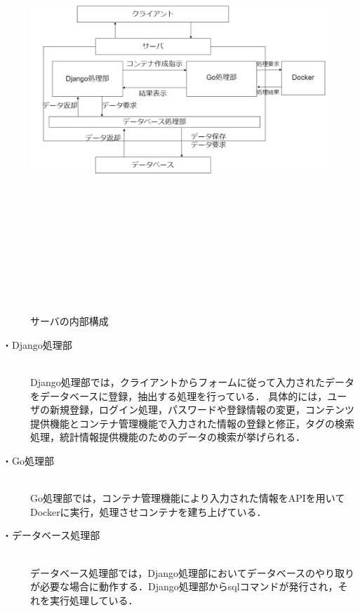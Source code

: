 \begin{figure}[htbp]
    \begin{center}
        \includegraphics[width=17cm,height=16cm,keepaspectratio]{server_arch-crop.pdf}\\
    \end{center}
    \caption{サーバの内部構成}
    \label{server_naibu}
\end{figure}

\begin{description}
    \item[・Django処理部]\mbox{}\\
        Django処理部では，クライアントからフォームに従って入力されたデータをデータベースに登録，抽出する処理を行っている．
        具体的には，ユーザの新規登録，ログイン処理，パスワードや登録情報の変更，コンテンツ提供機能とコンテナ管理機能で入力された情報の登録と修正，タグの検索処理，統計情報提供機能のためのデータの検索が挙げられる．
    \item[・Go処理部]\mbox{}\\
        Go処理部では，コンテナ管理機能により入力された情報をAPIを用いてDockerに実行，処理させコンテナを建ち上げている．
    \item[・データベース処理部]\mbox{}\\
        データベース処理部では，Django処理部においてデータベースのやり取りが必要な場合に動作する．Django処理部からsqlコマンドが発行され，それを実行処理している．
\end{description}

